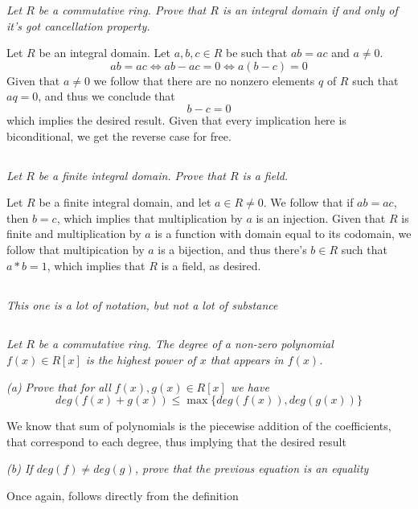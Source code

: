 \documentclass[11pt,oneside,titlepage]{book}
\DeclareMathOperator \lra {\Leftrightarrow}
\newcommand{\set}[1]{\{ #1 \}}
\begin{document}
\textit{Let $R$ be a commutative ring. Prove that $R$ is an integral
domain if and only of it's got cancellation property.}

Let $R$ be an integral domain.  Let $a, b, c \in R$ be such that $ab =
ac$ and $a \neq 0$.
$$ab = ac \lra ab - ac = 0 \lra a(b - c) = 0$$
Given that $a \neq 0$ we follow that there are no nonzero elements $q$
of $R$ such that $aq = 0$, and thus we conclude that
$$b - c = 0$$
which implies the desired result. Given that every implication here is
biconditional, we get the reverse case for free.

\subsection{}

\textit{Let $R$ be a finite integral domain. Prove that $R$ is a
field.}

Let $R$ be a finite integral domain, and let $a \in R \neq 0$. We
follow that if $ab = ac$, then $b = c$, which implies that
multiplication by $a$ is an injection. Given that $R$ is finite and
multiplication by $a$ is a function with domain equal to its codomain,
we follow that multipication by $a$ is a bijection, and thus there's
$b \in R$ such that $a * b = 1$, which implies that $R$ is a field, as
desired.

\subsection{}

\textit{This one is a lot of notation, but not a lot of substance}

\subsection{}

\textit{Let $R$ be a commutative ring. The degree of a non-zero
polynomial $f(x) \in R[x]$ is the highest power of $x$ that appears in
$f(x)$.}

\textit{(a) Prove that for all $f(x), g(x) \in R[x]$ we have
  $$deg(f(x) + g(x)) \leq \max \set{deg(f(x)), deg(g(x))}$$
}

We know that sum of polynomials is the piecewise addition of the
coefficients, that correspond to each degree, thus implying that the
desired result

\textit{(b) If $deg(f) \neq deg(g)$, prove that the previous equation
is an equality}

Once again, follows directly from the definition
\end{document}
